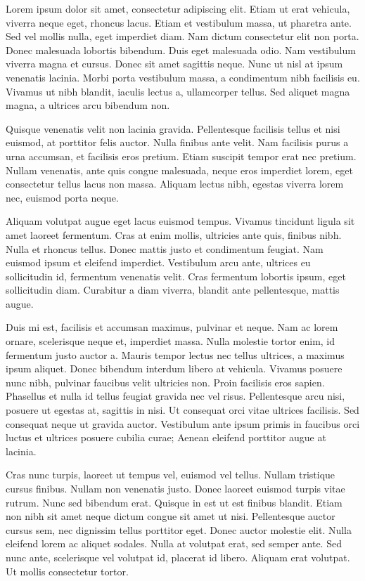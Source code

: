 Lorem ipsum dolor sit amet, consectetur adipiscing elit. Etiam ut erat vehicula, viverra neque eget, rhoncus lacus. Etiam et vestibulum massa, ut pharetra ante. Sed vel mollis nulla, eget imperdiet diam. Nam dictum consectetur elit non porta. Donec malesuada lobortis bibendum. Duis eget malesuada odio. Nam vestibulum viverra magna et cursus. Donec sit amet sagittis neque. Nunc ut nisl at ipsum venenatis lacinia. Morbi porta vestibulum massa, a condimentum nibh facilisis eu. Vivamus ut nibh blandit, iaculis lectus a, ullamcorper tellus. Sed aliquet magna magna, a ultrices arcu bibendum non.

Quisque venenatis velit non lacinia gravida. Pellentesque facilisis tellus et nisi euismod, at porttitor felis auctor. Nulla finibus ante velit. Nam facilisis purus a urna accumsan, et facilisis eros pretium. Etiam suscipit tempor erat nec pretium. Nullam venenatis, ante quis congue malesuada, neque eros imperdiet lorem, eget consectetur tellus lacus non massa. Aliquam lectus nibh, egestas viverra lorem nec, euismod porta neque.

Aliquam volutpat augue eget lacus euismod tempus. Vivamus tincidunt ligula sit amet laoreet fermentum. Cras at enim mollis, ultricies ante quis, finibus nibh. Nulla et rhoncus tellus. Donec mattis justo et condimentum feugiat. Nam euismod ipsum et eleifend imperdiet. Vestibulum arcu ante, ultrices eu sollicitudin id, fermentum venenatis velit. Cras fermentum lobortis ipsum, eget sollicitudin diam. Curabitur a diam viverra, blandit ante pellentesque, mattis augue.

Duis mi est, facilisis et accumsan maximus, pulvinar et neque. Nam ac lorem ornare, scelerisque neque et, imperdiet massa. Nulla molestie tortor enim, id fermentum justo auctor a. Mauris tempor lectus nec tellus ultrices, a maximus ipsum aliquet. Donec bibendum interdum libero at vehicula. Vivamus posuere nunc nibh, pulvinar faucibus velit ultricies non. Proin facilisis eros sapien. Phasellus et nulla id tellus feugiat gravida nec vel risus. Pellentesque arcu nisi, posuere ut egestas at, sagittis in nisi. Ut consequat orci vitae ultrices facilisis. Sed consequat neque ut gravida auctor. Vestibulum ante ipsum primis in faucibus orci luctus et ultrices posuere cubilia curae; Aenean eleifend porttitor augue at lacinia.

Cras nunc turpis, laoreet ut tempus vel, euismod vel tellus. Nullam tristique cursus finibus. Nullam non venenatis justo. Donec laoreet euismod turpis vitae rutrum. Nunc sed bibendum erat. Quisque in est ut est finibus blandit. Etiam non nibh sit amet neque dictum congue sit amet ut nisi. Pellentesque auctor cursus sem, nec dignissim tellus porttitor eget. Donec auctor molestie elit. Nulla eleifend lorem ac aliquet sodales. Nulla at volutpat erat, sed semper ante. Sed nunc ante, scelerisque vel volutpat id, placerat id libero. Aliquam erat volutpat. Ut mollis consectetur tortor.


